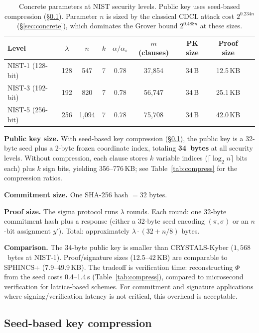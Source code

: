 \documentclass[11pt]{article}
\begin{document}
\begin{table}[ht]
\centering
\caption{Concrete parameters at NIST security levels.  Public key uses seed-based compression (\S\ref{sec:seed}).  Parameter $n$ is sized by the classical CDCL attack cost $2^{0.234n}$ (\S\ref{sec:concrete}), which dominates the Grover bound $2^{0.488n}$ at these sizes.}\label{tab:params}
\begin{tabular}{@{}lcccccccc@{}}
\toprule
Level & $\lambda$ & $n$ & $k$ & $\alpha/\alpha_s$ & $m$ (clauses) & PK size & Proof size \\
\midrule
NIST-1 (128-bit) & 128 & 547 & 7 & 0.78 & 37{,}854 & 34\,B & 12.5\,KB \\
NIST-3 (192-bit) & 192 & 820 & 7 & 0.78 & 56{,}747 & 34\,B & 25.1\,KB \\
NIST-5 (256-bit) & 256 & 1{,}094 & 7 & 0.78 & 75{,}708 & 34\,B & 42.0\,KB \\
\bottomrule
\end{tabular}
\end{table}

\noindent\textbf{Public key size.}  With seed-based key compression (\S\ref{sec:seed}), the public key is a 32-byte seed plus a 2-byte frozen coordinate index, totaling \textbf{34~bytes} at all security levels.  Without compression, each clause stores $k$ variable indices ($\lceil \log_2 n \rceil$ bits each) plus $k$ sign bits, yielding 356--776\,KB; see Table~\ref{tab:compress} for the compression ratios.

\noindent\textbf{Commitment size.}  One SHA-256 hash $= 32$ bytes.

\noindent\textbf{Proof size.}  The sigma protocol runs $\lambda$ rounds.  Each round: one 32-byte commitment hash plus a response (either a 32-byte seed encoding $(\pi,\sigma)$ or an $n$-bit assignment $y'$).  Total: approximately $\lambda \cdot (32 + n/8)$ bytes.

\noindent\textbf{Comparison.}  The 34-byte public key is smaller than CRYSTALS-Kyber ($1{,}568$~bytes at NIST-1).  Proof/signature sizes (12.5--42\,KB) are comparable to SPHINCS+ (7.9--49.9\,KB).  The tradeoff is verification time: reconstructing $\Phi$ from the seed costs 0.4--1.4\,s (Table~\ref{tab:compress}), compared to microsecond verification for lattice-based schemes.  For commitment and signature applications where signing/verification latency is not critical, this overhead is acceptable.


\subsection{Seed-based key compression}\label{sec:seed}
\end{document}
